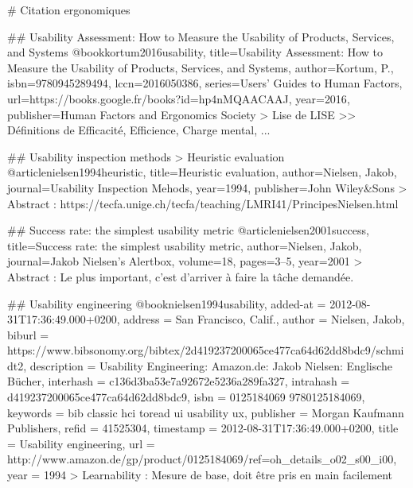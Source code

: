 # Citation ergonomiques

	## Usability Assessment: How to Measure the Usability of Products, Services, and Systems
	@book{kortum2016usability,
		title={Usability Assessment: How to Measure the Usability of Products, Services, and Systems},
		author={Kortum, P.},
		isbn={9780945289494},
		lccn={2016050386},
		series={Users' Guides to Human Factors},
		url={https://books.google.fr/books?id=hp4nMQAACAAJ},
		year={2016},
		publisher={Human Factors and Ergonomics Society}
	}
	> Lise de LISE
		>> Définitions de Efficacité, Efficience, Charge mental, ...


	## Usability inspection methods > Heuristic evaluation
	@article{nielsen1994heuristic,
		title={Heuristic evaluation},
		author={Nielsen, Jakob},
		journal={Usability Inspection Mehods},
		year={1994},
		publisher={John Wiley\&Sons}
	}
	> Abstract : https://tecfa.unige.ch/tecfa/teaching/LMRI41/PrincipesNielsen.html


	## Success rate: the simplest usability metric	
	@article{nielsen2001success,
		title={Success rate: the simplest usability metric},
		author={Nielsen, Jakob},
		journal={Jakob Nielsen’s Alertbox},
		volume={18},
		pages={3--5},
		year={2001}
	}
	> Abstract : Le plus important, c'est d'arriver à faire la tâche demandée.


	## Usability engineering
	@book{nielsen1994usability,
		added-at = {2012-08-31T17:36:49.000+0200},
		address = {San Francisco, Calif.},
		author = {Nielsen, Jakob},
		biburl = {https://www.bibsonomy.org/bibtex/2d419237200065ce477ca64d62dd8bdc9/schmidt2},
		description = {Usability Engineering: Amazon.de: Jakob Nielsen: Englische Bücher},
		interhash = {c136d3ba53e7a92672e5236a289fa327},
		intrahash = {d419237200065ce477ca64d62dd8bdc9},
		isbn = {0125184069 9780125184069},
		keywords = {bib classic hci toread ui usability ux},
		publisher = {Morgan Kaufmann Publishers},
		refid = {41525304},
		timestamp = {2012-08-31T17:36:49.000+0200},
		title = {Usability engineering},
		url = {http://www.amazon.de/gp/product/0125184069/ref=oh_details_o02_s00_i00},
		year = 1994
	}
	> Learnability : Mesure de base, doit être pris en main facilement


